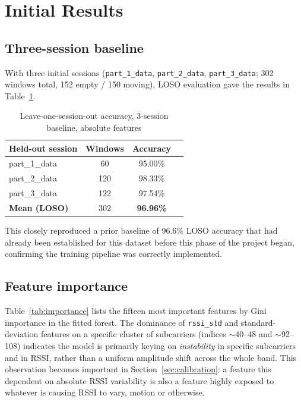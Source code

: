 \documentclass[11pt,a4paper]{article}
\begin{document}
\section{Initial Results}
\label{sec:results}

\subsection{Three-session baseline}

With three initial sessions (\texttt{part\_1\_data},
\texttt{part\_2\_data}, \texttt{part\_3\_data}; 302 windows total, 152
empty / 150 moving), LOSO evaluation gave the results in
Table~\ref{tab:loso3}.

\begin{table}[h]
\centering
\begin{tabular}{lccc}
\toprule
\textbf{Held-out session} & \textbf{Windows} & \textbf{Accuracy} \\
\midrule
part\_1\_data & 60  & 95.00\% \\
part\_2\_data & 120 & 98.33\% \\
part\_3\_data & 122 & 97.54\% \\
\midrule
\textbf{Mean (LOSO)} & 302 & \textbf{96.96\%} \\
\bottomrule
\end{tabular}
\caption{Leave-one-session-out accuracy, 3-session baseline, absolute features}
\label{tab:loso3}
\end{table}

This closely reproduced a prior baseline of 96.6\% LOSO accuracy that
had already been established for this dataset before this phase of the
project began, confirming the training pipeline was correctly
implemented.

\subsection{Feature importance}
\label{sec:feature-importance}

Table~\ref{tab:importance} lists the fifteen most important features by
Gini importance in the fitted forest. The dominance of
\texttt{rssi\_std} and standard-deviation features on a specific cluster
of subcarriers (indices \(\sim\)40--48 and \(\sim\)92--108) indicates the
model is primarily keying on \emph{instability} in specific subcarriers
and in RSSI, rather than a uniform amplitude shift across the whole
band. This observation becomes important in
Section~\ref{sec:calibration}: a feature this dependent on absolute RSSI
variability is also a feature highly exposed to whatever is causing RSSI
to vary, motion or otherwise.
\end{document}
